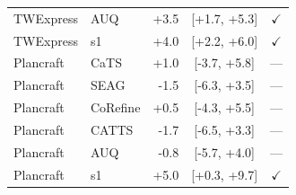 \begin{table}[t]
{\begin{tabular}{llrcc}
  TWExpress & AUQ & +3.5 & [+1.7, +5.3] & $\checkmark$ \\
  TWExpress & s1 & +4.0 & [+2.2, +6.0] & $\checkmark$ \\
  Plancraft & CaTS & +1.0 & [-3.7, +5.8] & --- \\
  Plancraft & SEAG & -1.5 & [-6.3, +3.5] & --- \\
  Plancraft & CoRefine & +0.5 & [-4.3, +5.5] & --- \\
  Plancraft & CATTS & -1.7 & [-6.5, +3.3] & --- \\
  Plancraft & AUQ & -0.8 & [-5.7, +4.0] & --- \\
  Plancraft & s1 & +5.0 & [+0.3, +9.7] & $\checkmark$ \\
\bottomrule
\end{tabular}%
}
\end{table}
